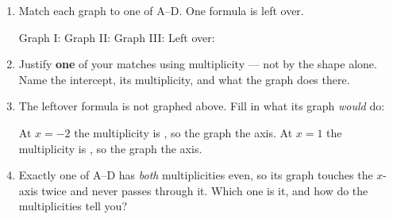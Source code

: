 \documentclass[10pt]{article}
\begin{document}
\boxguard
\begin{tcolorbox}[colback=white, colframe=black!40,
    title=\textbf{Tier A --- Approaching Proficiency},
    fonttitle=\bfseries, arc=2mm, left=3mm, right=3mm, top=2mm, bottom=2mm]

\begin{enumerate}[itemsep=8pt]
  \item Match each graph to one of A--D. One formula is left over.

        \smallskip
        Graph I:  \qquad Graph II:  \qquad
        Graph III:  \qquad Left over: 

  \item Justify \textbf{one} of your matches using multiplicity --- not by
        the shape alone. Name the intercept, its multiplicity, and what the
        graph does there.

        \vspace{0.05in}

  \item The leftover formula is not graphed above. Fill in what its graph
        \textit{would} do:

        \smallskip
        At $x = -2$ the multiplicity is , so the graph
         the axis. At $x = 1$ the multiplicity is
        , so the graph  the axis.

  \item Exactly one of A--D has \textit{both} multiplicities even, so its
        graph touches the $x$-axis twice and never passes through it. Which
        one is it, and how do the multiplicities tell you?

        \vspace{0.05in}
\end{enumerate}
\end{tcolorbox}

\vspace{0.1in}
\end{document}
